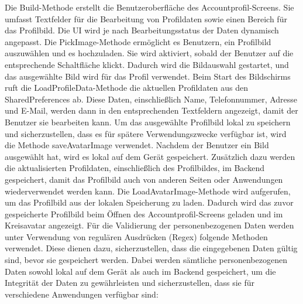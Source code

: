 Die Build-Methode erstellt die Benutzeroberfläche des Accountprofil-Screens. Sie umfasst Textfelder für die Bearbeitung von Profildaten sowie einen Bereich für das Profilbild. 
Die UI wird je nach Bearbeitungsstatus der Daten dynamisch angepasst. Die PickImage-Methode ermöglicht es Benutzern, ein Profilbild auszuwählen und es hochzuladen. Sie wird aktiviert, sobald der Benutzer auf die entsprechende Schaltfläche klickt.
Dadurch wird die Bildauswahl gestartet, und das ausgewählte Bild wird für das Profil verwendet. Beim Start des Bildschirms ruft die LoadProfileData-Methode die aktuellen Profildaten aus den SharedPreferences ab. 
Diese Daten, einschließlich Name, Telefonnummer, Adresse und E-Mail, werden dann in den entsprechenden Textfeldern angezeigt, damit der Benutzer sie bearbeiten kann. Um das ausgewählte Profilbild lokal zu speichern und sicherzustellen, dass es für spätere Verwendungszwecke verfügbar ist, wird die Methode saveAvatarImage verwendet.
Nachdem der Benutzer ein Bild ausgewählt hat, wird es lokal auf dem Gerät gespeichert. Zusätzlich dazu werden die aktualisierten Profildaten, einschließlich des Profilbildes, im Backend gespeichert, damit das Profilbild auch von anderen Seiten oder Anwendungen wiederverwendet werden kann. 
Die LoadAvatarImage-Methode wird aufgerufen, um das Profilbild aus der lokalen Speicherung zu laden. Dadurch wird das zuvor gespeicherte Profilbild beim Öffnen des Accountprofil-Screens geladen und im Kreisavatar angezeigt. 
Für die Validierung der personenbezogenen Daten werden unter Verwendung von regulären Ausdrücken (Regex) folgende Methoden verwendet. Diese dienen dazu, sicherzustellen, dass die eingegebenen Daten gültig sind, bevor sie gespeichert werden. Dabei werden sämtliche personenbezogenen Daten sowohl lokal auf dem Gerät als auch im Backend gespeichert, um die Integrität der Daten zu gewährleisten und sicherzustellen, dass sie für verschiedene Anwendungen verfügbar sind: 


